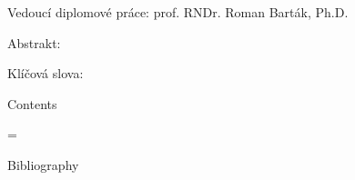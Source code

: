 Vedouc\'{i} diplomov\'{e} pr\'{a}ce: prof. RNDr. Roman Bart\'{a}k, Ph.D.

Abstrakt:

Kl\'{i}\v{c}ov\'{a} slova:

\vfil
\eject

{\chapfont\noindent Contents}
\vskip5mm
\maketoc

\vfill

\eject

\footline={\hss\folio\hss}
\def\zahlavi{\noindent{\it Bc. Michal Tul\'{a}\v{c}ek\kern3pt\headrule\kern3pt \the\title}}











\vfill\eject
{\chapfont\noindent Bibliography}
\bigskip


\vskip5mm

\bye
